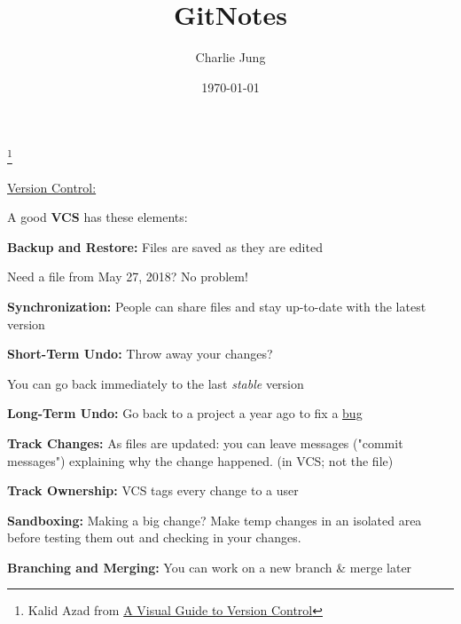 \documentclass{article}
\begin{document}
\title{GitNotes}
\author{Charlie Jung}
\thanks{Kalid Azad from \href{https://betterexplained.com/articles/a-visual-guide-to-version-control/}{A Visual Guide to Version Control}}
\date{\today}
\maketitle
\begin{flushleft}

\underline{Version Control:} \\
\par

A good \textbf{VCS} has these elements: \\
\par

\textbf{Backup and Restore:} Files are saved as they are edited \par
Need a file from May 27, 2018? No problem! \\
\par

\textbf{Synchronization:} People can share files and stay up-to-date with the latest version \\
\par

\textbf{Short-Term Undo:} Throw away your changes? \par
You can go back immediately to the last \textit{stable} version \\
\par

\textbf{Long-Term Undo:} Go back to a project a year ago to fix a \underline{bug} \\
\par

\textbf{Track Changes:} As files are updated: you can leave messages ("commit messages") explaining why the change happened. (in VCS; not the file) \\
\par

\textbf{Track Ownership:} VCS tags every change to a user \\
\par

\textbf{Sandboxing:} Making a big change? Make temp changes in an isolated area before testing them out and checking in your changes. \\
\par

\textbf{Branching and Merging:} You can work on a new branch \& merge later \\
\par


\end{flushleft}
\end{document}
